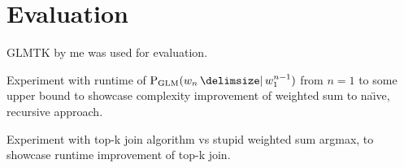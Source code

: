 \chapter{Evaluation}

\begin{draft}
GLMTK by me was used for evaluation.

Experiment with runtime of $\ProbGLM{w_n}{w_1^{n-1}}$ from $n=1$ to some upper
bound to showcase complexity improvement of weighted sum to na{\"\i}ve,
recursive approach.

Experiment with top-k join algorithm vs stupid weighted sum argmax, to showcase
runtime improvement of top-k join.
\end{draft}
